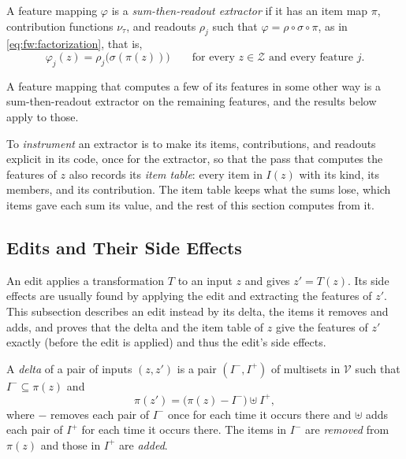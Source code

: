\label{def:fw:extractor}
{
A feature mapping $\varphi$ is a \emph{sum-then-readout extractor} if it has an item map $\pi$, contribution
functions $\nu_\tau$, and readouts $\rho_j$ such that $\varphi = \rho \circ \sigma \circ \pi$, as in
\eqref{eq:fw:factorization}, that is,
\begin{equation}
  \label{eq:fw:extractor}
  \varphi_j(z) = \rho_j\big(\sigma(\pi(z))\big) \qquad \text{for every } z \in \mathcal{Z} \text{ and every feature } j.
\end{equation}
}

\noindent A feature mapping that computes a few of its features in some other way is a sum-then-readout extractor on
the remaining features, and the results below apply to those.

To \emph{instrument} an extractor is to make its items, contributions, and readouts explicit in its code, once for the
extractor, so that the pass that computes the features of $z$ also records its \emph{item table}: every item in $I(z)$
with its kind, its members, and its contribution. The item table keeps what the sums lose, which items gave each sum
its value, and the rest of this section computes from it.

\subsection{Edits and Their Side Effects}
\label{sec:fw:side-effects}

An edit applies a transformation $T$ to an input $z$ and gives $z' = T(z)$. Its side effects are usually found by
applying the edit and extracting the features of $z'$. This subsection describes an edit instead by its delta, the
items it removes and adds, and proves that the delta and the item table of $z$ give the features of $z'$ exactly (before the edit is
applied) and thus the edit's side effects.

\label{def:fw:delta}
{
A \emph{delta} of a pair of inputs $(z, z')$ is a pair $(I^-, I^+)$ of multisets in $\mathcal{V}$ such that
$I^- \subseteq \pi(z)$ and
\begin{equation}
  \label{eq:fw:delta}
  \pi(z') = \big(\pi(z) - I^-\big) \uplus I^+,
\end{equation}
where $-$ removes each pair of $I^-$ once for each time it occurs there and $\uplus$ adds each pair of $I^+$ for
each time it occurs there. The items in $I^-$ are \emph{removed} from $\pi(z)$ and those in $I^+$ are \emph{added}.
}

